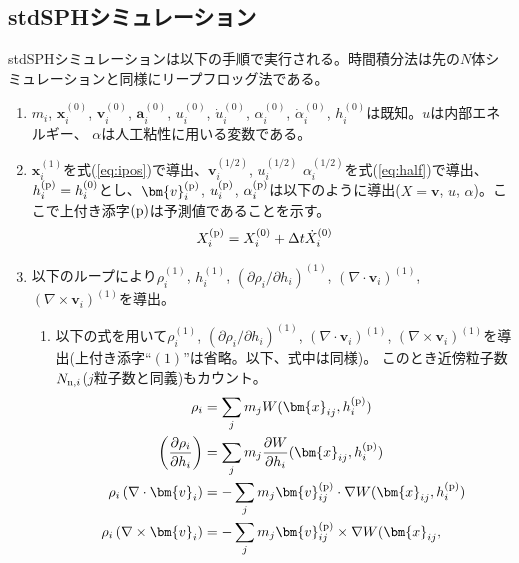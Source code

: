 \subsection{stdSPHシミュレーション}
\label{sec:stdsph}

stdSPHシミュレーションは以下の手順で実行される。時間積分法は先の$N$体シ
ミュレーションと同様にリープフロッグ法である。
\begin{enumerate}
\item $m_i$, $\bm{x}_i^{(0)}$, $\bm{v}_i^{(0)}$, $\bm{a}_i^{(0)}$,
  $u_i^{(0)}$, $\dot{u}_i^{(0)}$, $\alpha_i^{(0)}$,
  $\dot{\alpha}_i^{(0)}$, $h_i^{(0)}$は既知。$u$は内部エネルギー、
  $\alpha$は人工粘性に用いる変数である。
\item $\bm{x}_i^{(1)}$を式(\ref{eq:ipos})で導出、$\bm{v}_i^{(1/2)}$,
  $u_i^{(1/2)}$ $\alpha_i^{(1/2)}$を式(\ref{eq:half})で導出、
  $h_i^{({\rm p})}=h_i^{(0)}$とし、$\bm{v}_i^{({\rm p})}$, $u_i^{({\rm
    p})}$, $\alpha_i^{({\rm p})}$は以下のように導出($X=\bm{v}$, $u$,
  $\alpha$)。ここで上付き添字$({\rm p})$は予測値であることを示す。
  \begin{align}
    X_i^{({\rm p})} &= X_i^{(0)} + \Delta t
    \dot{X}_i^{(0)} \label{eq:pred}
  \end{align}
\item 以下のループにより$\rho_i^{(1)}$, $h_i^{(1)}$, $(\partial \rho_i
  / \partial h_i)^{(1)}$, $(\nabla \cdot \bm{v}_i)^{(1)}$, $(\nabla
  \times \bm{v}_i)^{(1)}$を導出。
  \label{proc:lpsph}
  \begin{enumerate}
    \renewcommand{\labelenumii}{\ref{proc:lpdisph}.\arabic{enumii}.}
  \item 以下の式を用いて$\rho_i^{(1)}$, $(\partial \rho_i / \partial
    h_i)^{(1)}$, $(\nabla \cdot \bm{v}_i)^{(1)}$, $(\nabla \times
    \bm{v}_i)^{(1)}$を導出(上付き添字``$(1)$''は省略。以下、式中は同様)。
    このとき近傍粒子数$N_{{\rm n},i}$($j$粒子数と同義)もカウント。
    \begin{align}
      \rho_i &= \sum_j m_j W(\bm{x}_{ij},h_i^{({\rm
          p})}) \label{eq:rhoi} \\ \left( \frac{\partial
        \rho_i}{\partial h_i} \right) &= \sum_j m_j \frac{\partial
        W}{\partial h_i}(\bm{x}_{ij}, h_i^{({\rm p})}) \\ \rho_i
      \left( \nabla \cdot \bm{v}_i \right) &= - \sum_j m_j
      \bm{v}_{ij}^{({\rm p})} \cdot \nabla W(\bm{x}_{ij}, h_i^{({\rm
          p})}) \\ \rho_i \left( \nabla \times \bm{v}_i \right) &= -
      \sum_j m_j \bm{v}_{ij}^{({\rm p})} \times \nabla W(\bm{x}_{ij},

\end{align}
\end{enumerate}
\end{enumerate}
